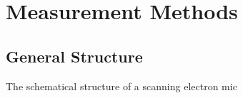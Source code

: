 \section{Measurement Methods}

\subsection{General Structure}
The schematical structure of a scanning electron mic
